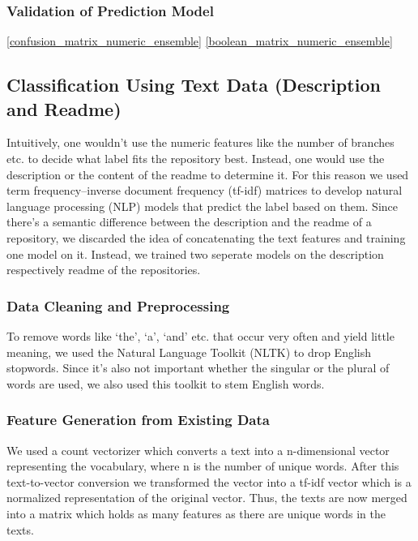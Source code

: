 \documentclass[%
a4paper,
DIV12,
2.5headlines,
bigheadings,
titlepage,
openbib,
]{scrartcl}
\begin{document}
\subsubsection{Validation of Prediction
Model}\label{validation-of-prediction-model}

\ref{confusion_matrix_numeric_ensemble}
\ref{boolean_matrix_numeric_ensemble}


\subsection{Classification Using Text Data (Description and
Readme)}\label{classification-using-text-data-description-and-readme}

Intuitively, one wouldn't use the numeric features like the number of branches etc. to decide what label fits the repository best.
Instead, one would use the description or the content of the readme to determine it.
For this reason we used term frequency--inverse document frequency (tf-idf) matrices to develop natural language processing (NLP) models that predict the label based on them.
Since there's a semantic difference between the description and the readme of a repository, we discarded the idea of concatenating the text features and training one model on it.
Instead, we trained two seperate models on the description respectively readme of the repositories.

\subsubsection{Data Cleaning and
Preprocessing}\label{data-cleaning-and-preprocessing-1}

To remove words like `the', `a', `and' etc. that occur very often and yield little meaning, we used the Natural Language Toolkit (NLTK) to drop English stopwords.
Since it's also not important whether the singular or the plural of words are used, we also used this toolkit to stem English words.

\subsubsection{Feature Generation from Existing
Data}\label{feature-generation-from-existing-data}

We used a count vectorizer which converts a text into a n-dimensional vector representing the vocabulary, where n is the number of unique words.
After this text-to-vector conversion we transformed the vector into a tf-idf vector which is a normalized representation of the original vector.
Thus, the texts are now merged into a matrix which holds as many features as there are unique words in the texts.
\end{document}
